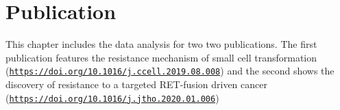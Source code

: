 \section{Publication}
\label{cascade-sec:publication}

This chapter includes the data analysis for two two publications.
The first publication features the resistance mechanism of small cell transformation (\href{https://doi.org/10.1016/j.ccell.2019.08.008}{\nolinkurl{https://doi.org/10.1016/j.ccell.2019.08.008}}\cite{Burr2019}) and the second shows the discovery of resistance to a targeted RET-fusion driven cancer (\href{https://doi.org/10.1016/j.jtho.2020.01.006}{\nolinkurl{https://doi.org/10.1016/j.jtho.2020.01.006}}\cite{Solomon2020})

